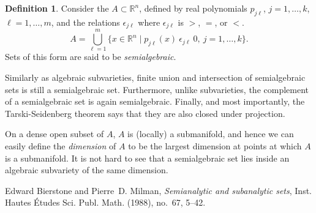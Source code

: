 \documentclass[12pt]{article}
\theoremstyle{theorem}
\theoremstyle{definition}
\newtheorem*{defn}{Definition}
\theoremstyle{remark}
\begin{document}
\begin{defn}
Consider the $A \subset {\mathbb{R}}^n$,
defined by
real polynomials $p_{j\ell}$, $j=1,\ldots,k$, $\ell=1,\ldots,m$,
 and the relations
$\epsilon_{j\ell}$ where $\epsilon_{j\ell}$ is $>$, $=$, or $<$.
\begin{equation}
A = \bigcup_{\ell=1}^m \{ x \in {\mathbb{R}}^n \mid p_{j\ell}(x) ~\epsilon_{j\ell} ~0, \ j=1,\ldots,k \} .
\end{equation}
Sets of this form are said to be {\em semialgebraic}.
\end{defn}

Similarly as algebraic subvarieties, finite union and intersection of semialgebraic sets is still a semialgebraic set.  Furthermore, unlike subvarieties, the complement of a semialgebraic set is again semialgebraic.  Finally, and most importantly, the Tarski-Seidenberg theorem says that they are also closed under projection.

On a dense open subset of $A$, $A$ is (locally) a submanifold, and hence we can easily
define the {\em dimension} of $A$ to be the largest dimension at points at which
$A$ is a submanifold.  It is not hard to see that a semialgebraic set
lies inside an algebraic subvariety of the same dimension.

\begin{thebibliography}{9}
Edward Bierstone and Pierre~D. Milman, \emph{Semianalytic and subanalytic
  sets}, Inst. Hautes \'Etudes Sci. Publ. Math. (1988), no.~67, 5--42.
\end{thebibliography}

\end{document}
